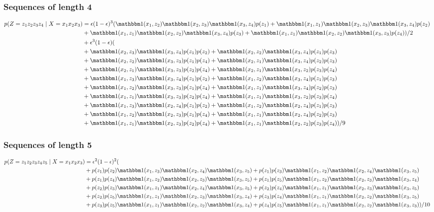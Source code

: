 \subsubsection{Sequences of length 4}

\begin{equation*}
  \begin{split}
    p(Z=z_1z_2z_3z_4 \gv X=x_1x_2x_3)
      &= \e(1-\e)^3 (\I(x_1, z_2)\I(x_2, z_3)\I(x_3, z_4)p(z_1)
      +\I(x_1, z_1)\I(x_2, z_3)\I(x_3, z_4)p(z_2)\\
      &+\I(x_1, z_1)\I(x_2, z_2)\I(x_3, z_4)p(z_3)
      +\I(x_1, z_1)\I(x_2, z_2)\I(x_3, z_3)p(z_4))/2\\
      &+\e^3(1-\e)(\\
      &+ \I(x_2, z_3)\I(x_3, z_4)p(z_1)p(z_2) + \I(x_2, z_2)\I(x_3, z_4)p(z_1)p(z_3)\\
      &+ \I(x_2, z_2)\I(x_3, z_3)p(z_1)p(z_4) + \I(x_2, z_1)\I(x_3, z_4)p(z_2)p(z_3)\\
      &+ \I(x_2, z_1)\I(x_3, z_3)p(z_2)p(z_4) + \I(x_2, z_1)\I(x_3, z_2)p(z_3)p(z_4)\\
      &+ \I(x_1, z_3)\I(x _3, z_4)p(z_1)p(z_2) + \I(x_1, z_2)\I(x_3, z_4)p(z_1)p(z_3)\\
      &+ \I(x_1, z_2)\I(x_3, z_3)p(z_1)p(z_4) + \I(x_1, z_1)\I(x_3, z_4)p(z_2)p(z_3)\\
      &+ \I(x_1, z_1)\I(x_3, z_3)p(z_2)p(z_4) + \I(x_1, z_1)\I(x_3, z_2)p(z_3)p(z_4)\\
      &+ \I(x_1, z_3)\I(x_2, z_4)p(z_1)p(z_2) + \I(x_1, z_2)\I(x_2, z_4)p(z_1)p(z_3)\\
      &+ \I(x_1, z_2)\I(x_2, z_3)p(z_1)p(z_4) + \I(x_1, z_1)\I(x_2, z_4)p(z_2)p(z_3)\\
      &+ \I(x_1, z_1)\I(x_2, z_3)p(z_2)p(z_4) + \I(x_1, z_1)\I(x_2, z_2)p(z_3)p(z_4))/9
  \end{split}
\end{equation*}

\subsubsection{Sequences of length 5}

\begin{equation*}
  \begin{split}
    p(Z=z_1z_2z_3z_4z_5 \gv X=x_1x_2x_3)
        &= \e^2(1-\e)^2(\\
        &+p(z_1)p(z_2)\I(x_1, z_3)\I(x_2, z_4)\I(x_3, z_5)+p(z_1)p(z_3)\I(x_1, z_2)\I(x_2, z_4)\I(x_3, z_5)\\
        &+p(z_1)p(z_4)\I(x_1, z_2)\I(x_2, z_3)\I(x_3, z_5)+p(z_1)p(z_5)\I(x_1, z_2)\I(x_2, z_3)\I(x_3, z_4)\\
        &+p(z_2)p(z_3)\I(x_1, z_1)\I(x_2, z_4)\I(x_3, z_5)+p(z_2)p(z_4)\I(x_1, z_1)\I(x_2, z_3)\I(x_3, z_5)\\
        &+p(z_2)p(z_5)\I(x_1, z_1)\I(x_2, z_3)\I(x_3, z_4)+p(z_3)p(z_4)\I(x_1, z_1)\I(x_2, z_2)\I(x_3, z_5)\\
        &+p(z_3)p(z_5)\I(x_1, z_1)\I(x_2, z_2)\I(x_3, z_4)+p(z_4)p(z_5)\I(x_1, z_1)\I(x_2, z_2)\I(x_3, z_3))/10
  \end{split}
\end{equation*}

